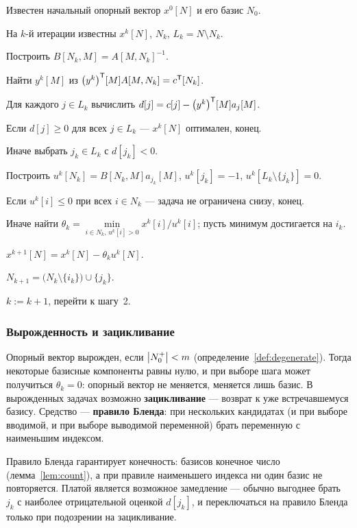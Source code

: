 \begin{algo}[title={Симплекс-метод}]
Известен начальный опорный вектор $x^0[N]$ и его базис $N_0$.
\begin{steps}
  \item На $k$-й итерации известны $x^k[N]$, $N_k$, $L_k = N \setminus N_k$.
  \item Построить $B[N_k,M] = A[M,N_k]^{-1}$.
  \item Найти $y^k[M]$ из $\big(y^k\big)^{\mathsf{T}}[M]A[M,N_k] = c^{\mathsf{T}}[N_k]$.
  \item Для каждого $j \in L_k$ вычислить
        $d[j] = c[j] - \big(y^k\big)^{\mathsf{T}}[M]a_j[M]$.
  \item Если $d[j] \ge 0$ для всех $j \in L_k$ — $x^k[N]$ оптимален, конец.
  \item Иначе выбрать $j_k \in L_k$ с $d[j_k] < 0$.
  \item Построить $u^k[N_k] = B[N_k,M]a_{j_k}[M]$, $u^k[j_k] = -1$,
        $u^k[L_k\setminus\{j_k\}] = 0$.
  \item Если $u^k[i] \le 0$ при всех $i \in N_k$ — задача не ограничена снизу,
        конец.
  \item Иначе найти
        $\theta_k = \min\limits_{i \in N_k,\, u^k[i]>0} x^k[i]/u^k[i]$;
        пусть минимум достигается на $i_k$.
  \item $x^{k+1}[N] = x^k[N] - \theta_k u^k[N]$.
  \item $N_{k+1} = \big(N_k \setminus \{i_k\}\big) \cup \{j_k\}$.
  \item $k := k+1$, перейти к шагу~2.
\end{steps}
\end{algo}

\subsubsection*{Вырожденность и зацикливание}

Опорный вектор вырожден, если $\left\lvert N_0^{+} \right\rvert < m$ (определение~\ref{def:degenerate}).
Тогда некоторые базисные компоненты равны нулю, и при выборе шага может
получиться $\theta_k = 0$: опорный вектор не меняется, меняется лишь базис. В
вырожденных задачах возможно \textbf{зацикливание} — возврат к уже
встречавшемуся базису. Средство — \textbf{правило Бленда}: при нескольких
кандидатах (и при выборе вводимой, и при выборе выводимой переменной) брать
переменную с наименьшим индексом.

\begin{idea}
Правило Бленда гарантирует конечность: базисов конечное число
(лемма~\ref{lem:count}), а при правиле наименьшего индекса ни один базис не
повторяется. Платой является возможное замедление — обычно выгоднее брать
$j_k$ с наиболее отрицательной оценкой $d[j_k]$, и переключаться на правило
Бленда только при подозрении на зацикливание.
\end{idea}

